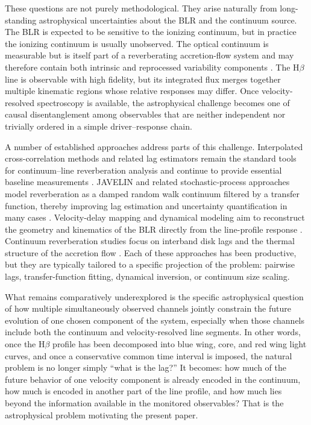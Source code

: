 \documentclass[fleqn,usenatbib]{mnras}
\begin{document}
These questions are not purely methodological. They arise naturally from long-standing astrophysical uncertainties about the BLR and the continuum source. The BLR is expected to be sensitive to the ionizing continuum, but in practice the ionizing continuum is usually unobserved. The optical continuum is measurable but is itself part of a reverberating accretion-flow system and may therefore contain both intrinsic and reprocessed variability components \cite{Fausnaugh2017,Cackett2021}. The H$\beta$ line is observable with high fidelity, but its integrated flux merges together multiple kinematic regions whose relative responses may differ. Once velocity-resolved spectroscopy is available, the astrophysical challenge becomes one of causal disentanglement among observables that are neither independent nor trivially ordered in a simple driver--response chain.

A number of established approaches address parts of this challenge. Interpolated cross-correlation methods and related lag estimators remain the standard tools for continuum--line reverberation analysis and continue to provide essential baseline measurements \cite{Peterson2004,WhitePeterson1994}. JAVELIN and related stochastic-process approaches model reverberation as a damped random walk continuum filtered by a transfer function, thereby improving lag estimation and uncertainty quantification in many cases \cite{Zu2011,Zu2013}. Velocity-delay mapping and dynamical modeling aim to reconstruct the geometry and kinematics of the BLR directly from the line-profile response \cite{Pancoast2014,Horne2021}. Continuum reverberation studies focus on interband disk lags and the thermal structure of the accretion flow \cite{Fausnaugh2016,Fausnaugh2017,Edelson2019}. Each of these approaches has been productive, but they are typically tailored to a specific projection of the problem: pairwise lags, transfer-function fitting, dynamical inversion, or continuum size scaling.

What remains comparatively underexplored is the specific astrophysical question of how multiple simultaneously observed channels jointly constrain the future evolution of one chosen component of the system, especially when those channels include both the continuum and velocity-resolved line segments. In other words, once the H$\beta$ profile has been decomposed into blue wing, core, and red wing light curves, and once a conservative common time interval is imposed, the natural problem is no longer simply ``what is the lag?'' It becomes: how much of the future behavior of one velocity component is already encoded in the continuum, how much is encoded in another part of the line profile, and how much lies beyond the information available in the monitored observables? That is the astrophysical problem motivating the present paper.
\end{document}

